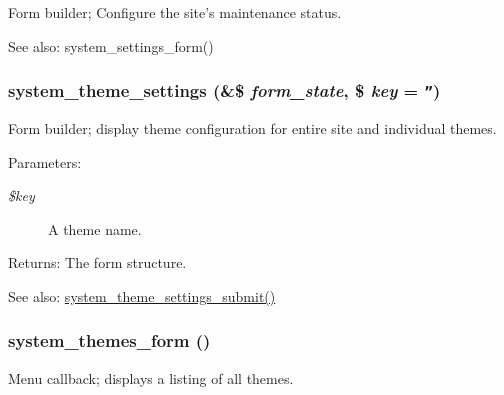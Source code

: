 Form builder; Configure the site's maintenance status.

\begin{Desc}
\item[See also:]system\_\-settings\_\-form() \end{Desc}
\hypertarget{group__forms_g7cc637f50b1399befe30a24af784817b}{
\subsubsection[{system\_\-theme\_\-settings}]{\setlength{\rightskip}{0pt plus 5cm}system\_\-theme\_\-settings (\&\$ {\em form\_\-state}, \/  \$ {\em key} = {\tt ''})}}
\label{group__forms_g7cc637f50b1399befe30a24af784817b}


Form builder; display theme configuration for entire site and individual themes.

\begin{Desc}
\item[Parameters:]
\begin{description}
\item[{\em \$key}]A theme name. \end{description}
\end{Desc}
\begin{Desc}
\item[Returns:]The form structure.\end{Desc}
\begin{Desc}
\item[See also:]\hyperlink{system_8admin_8inc_5403622cfdf9642a628637c4b4836c72}{system\_\-theme\_\-settings\_\-submit()} \end{Desc}
\hypertarget{group__forms_g8f88b0723dcb0f229a0d8b10687b8059}{
\subsubsection[{system\_\-themes\_\-form}]{\setlength{\rightskip}{0pt plus 5cm}system\_\-themes\_\-form ()}}
\label{group__forms_g8f88b0723dcb0f229a0d8b10687b8059}


Menu callback; displays a listing of all themes.

